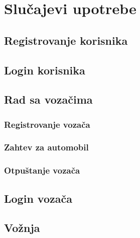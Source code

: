 \section{\bfseries Slu\v cajevi upotrebe}

\subsection{\bfseries Registrovanje korisnika}
\subsection{\bfseries Login korisnika}
\subsection{\bfseries Rad sa voza\v cima}
\subsubsection{\bfseries Registrovanje voza\v ca}
\subsubsection{\bfseries Zahtev za automobil}
\subsubsection{\bfseries Otpu\v stanje voza\v ca}
\subsection{\bfseries Login voza\v ca}

\subsection{\bfseries Vo\v znja}

